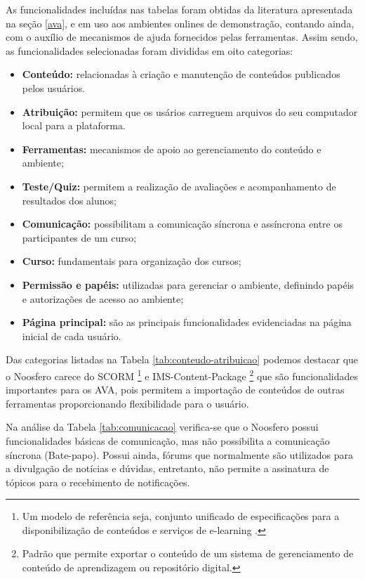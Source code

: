 As funcionalidades incluídas nas tabelas foram obtidas da literatura apresentada na seção \ref{ava}, e em uso aos ambientes onlines de demonstração, contando ainda, com o auxílio de mecanismos de ajuda fornecidos pelas ferramentas. Assim sendo, as funcionalidades selecionadas foram divididas em oito categorias:
\begin{itemize}
\item \textbf{Conteúdo:} relacionadas à criação e manutenção de conteúdos publicados pelos usuários.
\item \textbf{Atribuição:} permitem que os usários carreguem arquivos do seu computador local para a plataforma.
\item \textbf{Ferramentas:} mecanismos de apoio ao gerenciamento do conteúdo e ambiente;
\item \textbf{Teste/Quiz:} permitem a realização de avaliações e acompanhamento de resultados dos alunos;
\item \textbf{Comunicação:} possibilitam a comunicação síncrona e assíncrona entre os participantes de um curso;
\item \textbf{Curso:} fundamentais para organização dos cursos;
\item \textbf{Permissão e papéis:} utilizadas para gerenciar o ambiente, definindo papéis e autorizações de acesso ao ambiente;
\item \textbf{Página principal:} são as principais funcionalidades evidenciadas na página inicial de cada usuário.
\end{itemize}

Das categorias listadas na Tabela \ref{tab:conteudo-atribuicao} podemos destacar que o Noosfero carece do SCORM \footnote{Um modelo de referência seja, conjunto unificado de especificações para a disponibilização de conteúdos e serviços de e-learning \cite{de2006objetos}.} e IMS-Content-Package \footnote{Padrão que permite exportar o conteúdo de um sistema de gerenciamento de conteúdo de aprendizagem ou repositório digital.} que são funcionalidades importantes para os AVA, pois permitem a importação de conteúdos de outras ferramentas proporcionando flexibilidade para o usuário.

Na análise da Tabela \ref{tab:comunicacao} verifica-se que o Noosfero possui funcionalidades básicas de comunicação, mas não possibilita a comunicação síncrona (Bate-papo). Possui ainda, fórums que normalmente são utilizados para a divulgação de notícias e dúvidas, entretanto, não permite a assinatura de tópicos para o recebimento de notificações.

